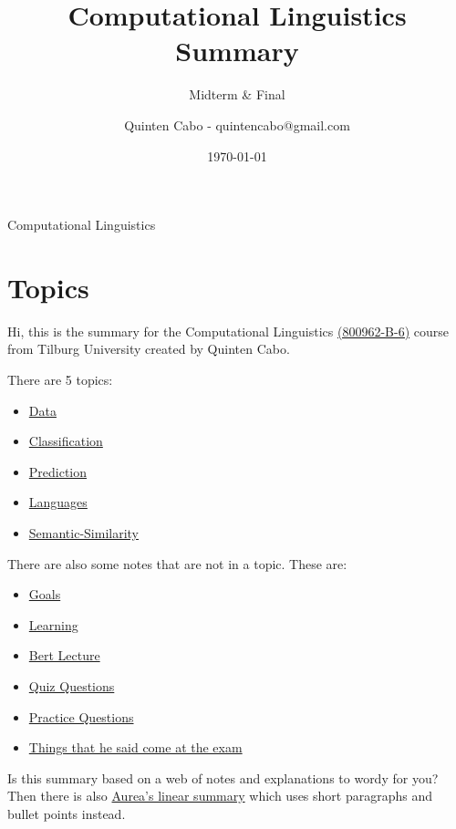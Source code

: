 \documentclass[
  11pt,
  british,
]{article}
\title{Computational Linguistics Summary}
\subtitle{Midterm \& Final}
\author{Quinten Cabo - quintencabo@gmail.com}
\date{\today}
\providecommand{\tightlist}{%
  \setlength{\itemsep}{0pt}\setlength{\parskip}{0pt}}
\begin{document}
\maketitle

\listoffigures
\listoftables
{}
Computational Linguistics

\pagebreak

\hypertarget{topics}{%
\section{Topics}\label{topics}}

Hi, this is the summary for the Computational Linguistics
\href{https://uvt.osiris-student.nl/\#/onderwijscatalogus/extern/examenprogramma/16322/8B218-2021?taal=en}{(800962-B-6)}
course from Tilburg University created by Quinten Cabo.

There are 5 topics:

\begin{itemize}
\tightlist
\item
  \href{Data.md}{Data}
\item
  \href{Classification.md}{Classification}
\item
  \href{Prediction.md}{Prediction}
\item
  \href{Languages.md}{Languages}
\item
  \href{Semantic-Similarity.md}{Semantic-Similarity}
\end{itemize}

There are also some notes that are not in a topic. These are:

\begin{itemize}
\tightlist
\item
  \href{Goals.md}{Goals}
\item
  \href{Learning.md}{Learning}
\item
  \href{Other/Bert\%20Lecture.md}{Bert Lecture}
\item
  \href{Other/Quiz\%20Questions.md}{Quiz Questions}
\item
  \href{Other/Practice\%20Questions.md}{Practice Questions}
\item
  \href{Other/Things\%20that\%20he\%20said\%20come\%20at\%20the\%20exam.md}{Things
  that he said come at the exam}
\end{itemize}

Is this summary based on a web of notes and explanations to wordy for
you? Then there is also
\href{Other/Computational-Linguistics-Aurea.pdf}{Aurea's linear summary}
which uses short paragraphs and bullet points instead.
\end{document}

